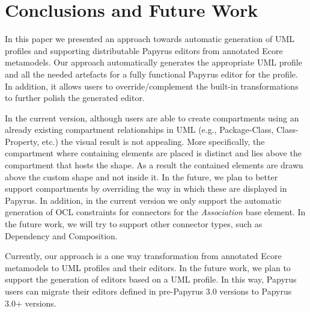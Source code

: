 \section{Conclusions and Future Work}
\label{sec:future}
In this paper we presented an approach towards automatic generation of UML profiles and supporting distributable Papyrus editors from annotated Ecore metamodels. 
Our approach automatically generates the appropriate UML profile and all the needed artefacts for a fully functional Papyrus editor for the profile. 
In addition, it allows users to override/complement the built-in transformations to further polish the generated editor.

In the current version, although users are able to create compartments using an already existing compartment relationships in UML (e.g., Package-Class, Class-Property, etc.) the visual result is not appealing. 
More specifically, the compartment where containing elements are placed is distinct and lies above the compartment that hosts the shape. 
As a result the contained elements are drawn above the custom shape and not inside it. 
In the future, we plan to better support compartments by overriding the way in which these are displayed in Papyrus. 
In addition, in the current version we only support the automatic generation of OCL constraints for connectors for the \textit{Association} base element.
In the future work, we will try to support other connector types, such as Dependency and Composition. 

Currently, our approach is a one way transformation from annotated Ecore metamodels to UML profiles and their editors. 
In the future work, we plan to support the generation of editors based on a UML profile. 
In this way, Papyrus users can migrate their editors defined in pre-Papyrus 3.0 versions to Papyrus 3.0+ versions.
\\

